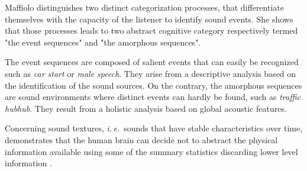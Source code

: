 \documentclass[preprint,12pt]{elsarticle}
\newcommand{\ie}{\emph{i.\,e.}}
\begin{document}
Maffiolo \cite{maffiolo_caracterisation_1999} distinguishes two distinct categorization processes, that differentiate themselves with the capacity of the listener to identify sound events. She shows that those processes leads to two abstract cognitive category respectively termed "the event sequences" and "the amorphous sequences".


The event sequences are composed of salient events that can easily be recognized such as \emph{car start} or \emph{male speech}. They arise from a descriptive analysis based on the identification of the sound sources. On the contrary, the amorphous sequences are sound environments where distinct events can hardly be found, such as \emph{traffic hubhub}. They result from a holistic analysis based on global acoustic features.


Concerning sound textures, \ie~sounds that have stable characteristics over time, \cite{mcdermott2011sound,mcdermott2013summary} demonstrates that the human brain can decide not to abstract the physical information available using some of the summary statistics discarding lower level information \cite{nelken2013ear}.

\end{document}
